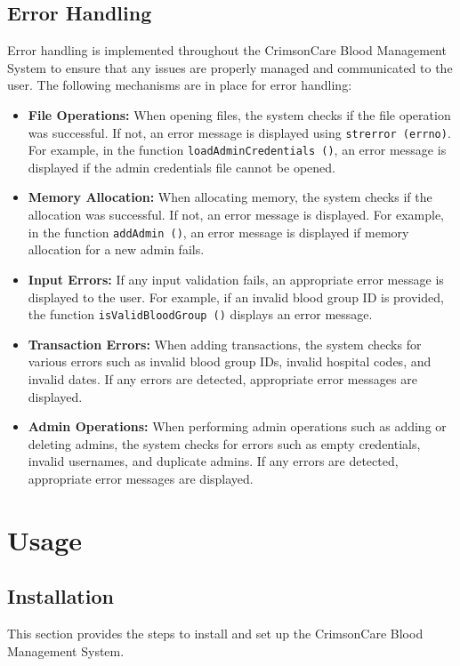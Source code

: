 \documentclass[12pt,a4paper]{report}
\begin{document}
\section{Error Handling}
Error handling is implemented throughout the CrimsonCare Blood Management System to ensure that any issues are properly managed and communicated to the user. The following mechanisms are in place for error handling:

\begin{itemize}
    \item \textbf{File Operations:} When opening files, the system checks if the file operation was successful. If not, an error message is displayed using \texttt{strerror (errno)}. For example, in the function \texttt{loadAdminCredentials ()}, an error message is displayed if the admin credentials file cannot be opened.
    \item \textbf{Memory Allocation:} When allocating memory, the system checks if the allocation was successful. If not, an error message is displayed. For example, in the function \texttt{addAdmin ()}, an error message is displayed if memory allocation for a new admin fails.
    \item \textbf{Input Errors:} If any input validation fails, an appropriate error message is displayed to the user. For example, if an invalid blood group ID is provided, the function \texttt{isValidBloodGroup ()} displays an error message.
    \item \textbf{Transaction Errors:} When adding transactions, the system checks for various errors such as invalid blood group IDs, invalid hospital codes, and invalid dates. If any errors are detected, appropriate error messages are displayed.
    \item \textbf{Admin Operations:} When performing admin operations such as adding or deleting admins, the system checks for errors such as empty credentials, invalid usernames, and duplicate admins. If any errors are detected, appropriate error messages are displayed.
\end{itemize}

\chapter{Usage}
\section{Installation}
This section provides the steps to install and set up the CrimsonCare Blood Management System.
\end{document}
